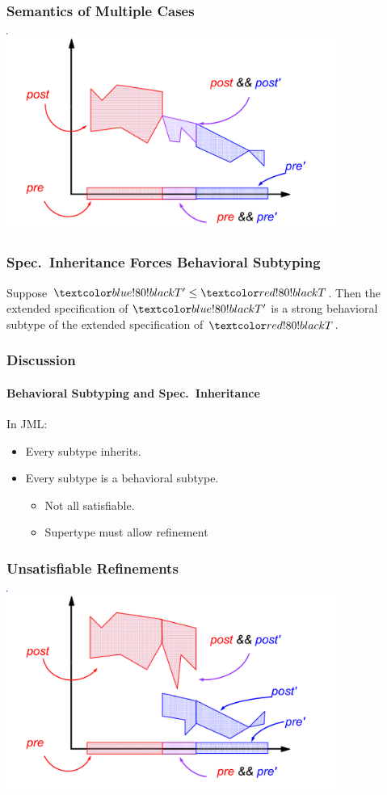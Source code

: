 \begin{frame}
\frametitle{Semantics of Multiple Cases}
\includegraphics[width=4.25in]{join-intersect}
\end{frame}

\begin{frame}
\frametitle{Spec.~Inheritance Forces Behavioral Subtyping}
\begin{theorem}
Suppose $\BLUETP \STO \REDT$.
Then the extended specification of $\BLUETP$
is a strong behavioral subtype of
the extended specification of $\REDT$.
\end{theorem}
\end{frame}

\begin{frame}
\frametitle{Discussion}
\framesubtitle{Behavioral Subtyping and Spec.~Inheritance}

In JML:
\begin{itemize}
\item
Every subtype inherits.

\item
Every subtype is a behavioral subtype.
\begin{itemize}
\item
Not all satisfiable.

\item
Supertype must allow refinement
\end{itemize}
\end{itemize}
\end{frame}

\begin{frame}
\frametitle{Unsatisfiable Refinements}
\includegraphics[width=4.25in]{unsatisfiable}
\end{frame}

